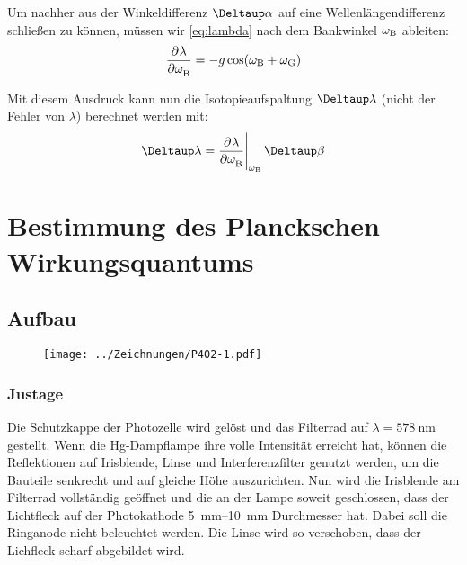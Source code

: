 Um nachher aus der Winkeldifferenz $\Deltaup \alpha$ auf eine
Wellenlängendifferenz schließen zu können, müssen wir \eqref{eq:lambda} nach
dem Bankwinkel $\omega_\text B$ ableiten:
\begin{equation}
    \label{eq:d_Lambda_d_beta}
    \dpd\lambda\omegaB = - g \cos(\omegaB + \omegaG)
\end{equation}

Mit diesem Ausdruck kann nun die Isotopieaufspaltung $\Deltaup \lambda$ (nicht
der Fehler von $\lambda$) berechnet werden mit:
\begin{equation}
    \label{eq:Delta_lambda}
    \Deltaup\lambda = \eval{\dpd\lambda\omegaB}_{\omegaB} \Deltaup\beta
\end{equation}


\FloatBarrier
\chapter{Bestimmung des Planckschen Wirkungsquantums}

\FloatBarrier
\section{Aufbau}

\begin{figure}[htbp]
    \centering
    \texttt{[image: ../Zeichnungen/P402-1.pdf]}
    \caption{%
        \parencite[Abbildung~P402.1]{physik412-Anleitung}
    }
    \label{fig:P402.1}
\end{figure}

\FloatBarrier
\subsection{Justage}

Die Schutzkappe der Photozelle wird gelöst und das Filterrad auf $\lambda =
\SI{578}{\nano\meter}$ gestellt. Wenn die Hg-Dampflampe ihre volle Intensität
erreicht hat, können die Reflektionen auf Irisblende, Linse und
Interferenzfilter genutzt werden, um die Bauteile senkrecht und auf gleiche
Höhe auszurichten. Nun wird die Irisblende am Filterrad vollständig geöffnet
und die an der Lampe soweit geschlossen, dass der Lichtfleck auf der
Photokathode \SIrange{5}{10}{\milli\meter} Durchmesser hat. Dabei soll die
Ringanode nicht beleuchtet werden. Die Linse wird so verschoben, dass der
Lichfleck scharf abgebildet wird.

